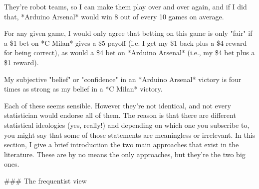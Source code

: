 \item They're robot teams, so I can make them play over and over again, and if I did that, *Arduino Arsenal* would win 8 out of every 10 games on average.
\item For any given game, I would only agree that betting on this game is only "fair" if a \$1 bet on *C Milan* gives a \$5 payoff (i.e. I get my \$1 back plus a \$4 reward for being correct), as would a \$4 bet on *Arduino Arsenal* (i.e., my \$4 bet plus a \$1 reward). 
\item My subjective "belief" or "confidence" in an *Arduino Arsenal* victory is four times as strong as my belief in a *C Milan* victory.

Each of these seems sensible. However they're not identical, and not every statistician would endorse all of them. The reason is that there are different statistical ideologies (yes, really!) and depending on which one you subscribe to, you might say that some of those statements are meaningless or irrelevant. In this section, I give a brief introduction the two main approaches that exist in the literature. These are by no means the only approaches, but they're the two big ones. 


### The frequentist view

